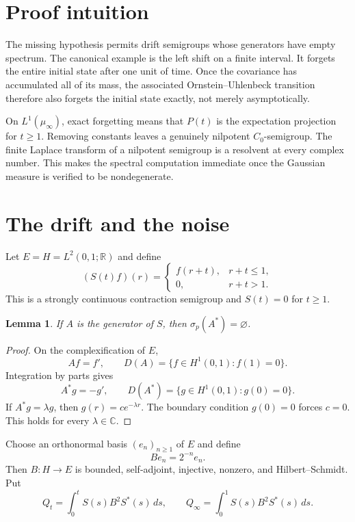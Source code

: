 \documentclass[11pt]{article}
\newtheorem{lemma}[theorem]{Lemma}
\newcommand{\C}{\mathbb C}
\newcommand{\spec}{\sigma}
\begin{document}
\section{Proof intuition}

The missing hypothesis permits drift semigroups whose generators have empty
spectrum.  The canonical example is the left shift on a finite interval.  It
forgets the entire initial state after one unit of time.  Once the covariance
has accumulated all of its mass, the associated Ornstein--Uhlenbeck transition
therefore also forgets the initial state exactly, not merely asymptotically.

On $L^1(\mu_\infty)$, exact forgetting means that $P(t)$ is the expectation
projection for $t\geq1$.  Removing constants leaves a genuinely nilpotent
$C_0$-semigroup.  The finite Laplace transform of a nilpotent semigroup is a
resolvent at every complex number.  This makes the spectral computation
immediate once the Gaussian measure is verified to be nondegenerate.

\section{The drift and the noise}

Let $E=H=L^2(0,1;\mathbb R)$ and define
\[
 (S(t)f)(r)=
 \begin{cases}
  f(r+t),&r+t\leq1,\\
  0,&r+t>1.
 \end{cases}
\]
This is a strongly continuous contraction semigroup and $S(t)=0$ for
$t\geq1$.

\begin{lemma}\label{lem:adjoint}
If $A$ is the generator of $S$, then $\spec_p(A^*)=\varnothing$.
\end{lemma}

\begin{proof}
On the complexification of $E$,
\[
 Af=f',\qquad
 D(A)=\{f\in H^1(0,1):f(1)=0\}.
\]
Integration by parts gives
\[
 A^*g=-g',\qquad
 D(A^*)=\{g\in H^1(0,1):g(0)=0\}.
\]
If $A^*g=\lambda g$, then $g(r)=ce^{-\lambda r}$.  The boundary condition
$g(0)=0$ forces $c=0$.  This holds for every $\lambda\in\C$.
\end{proof}

Choose an orthonormal basis $(e_n)_{n\geq1}$ of $E$ and define
\[
 Be_n=2^{-n}e_n.
\]
Then $B:H\to E$ is bounded, self-adjoint, injective, nonzero, and
Hilbert--Schmidt.  Put
\[
 Q_t=\int_0^t S(s)B^2S^*(s)\,ds,
 \qquad
 Q_\infty=\int_0^1 S(s)B^2S^*(s)\,ds.                 \tag{1}
\]
\end{document}
